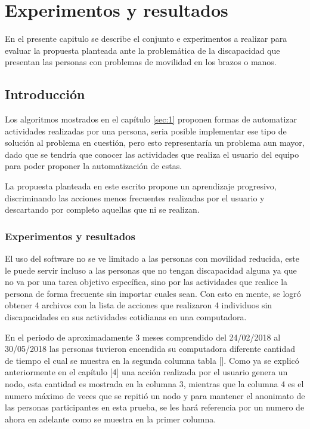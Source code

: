 \chapter{Experimentos y resultados}
\label{sec:chapter5}

En el presente capitulo se describe el conjunto e experimentos a realizar para evaluar la propuesta planteada ante la problemática de la discapacidad que presentan las personas con problemas de movilidad en los brazos o manos.


\section{Introducci\'on}

Los algoritmos mostrados en el capítulo \ref{sec:1} proponen formas de automatizar actividades realizadas por una persona, seria posible implementar ese tipo de solución al problema en cuestión, pero esto representaría un problema aun mayor, dado que se tendría que conocer las actividades que realiza el usuario del equipo para poder proponer la automatización de estas. 


La propuesta planteada en este escrito propone un aprendizaje progresivo, discriminando las acciones menos frecuentes realizadas por el usuario y descartando por completo aquellas que ni se realizan. 


\subsection{Experimentos y resultados}

El uso del software no se ve limitado a las personas con movilidad reducida, este le puede servir incluso a las personas que no tengan discapacidad alguna ya que no va por una tarea objetivo específica, sino por las actividades que realice la persona de forma frecuente sin importar cuales sean. Con esto en mente, se logró obtener 4 archivos con la lista de acciones que realizaron 4 individuos sin discapacidades en sus actividades cotidianas en una computadora.


En el periodo de aproximadamente 3 meses comprendido del 24/02/2018 al 30/05/2018 las personas tuvieron encendida su computadora diferente cantidad de tiempo el cual se muestra en la segunda columna tabla []. Como ya se explicó anteriormente en el capítulo [4] una acción realizada por el usuario genera un nodo, esta cantidad es mostrada en la columna 3, mientras que la columna 4 es el numero máximo de veces que se repitió un nodo y para mantener el anonimato de las personas participantes en esta prueba, se les hará referencia por un numero de ahora en adelante como se muestra en la primer columna. 

